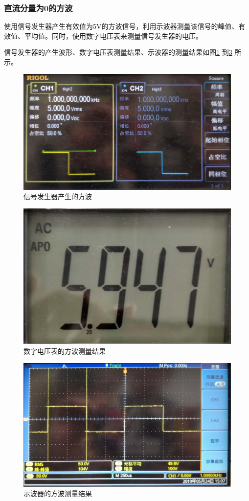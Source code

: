 \documentclass[12pt]{article}
\begin{document}
\subsubsection{直流分量为0的方波}
使用信号发生器产生有效值为5V的方波信号，利用示波器测量该信号的峰值、有效值、平均值。同时，使用数字电压表来测量信号发生器的电压。\par
信号发生器的产生波形、数字电压表测量结果、示波器的测量结果如图\ref{dianyacelfb1}
到\ref{dianyacelfb3}
所示。
\begin{figure}[htbp]
    \centering
    \includegraphics[width=.5\textwidth]{P009}
    \caption{信号发生器产生的方波}\label{dianyacelfb1}
  \end{figure}
  \begin{figure}[htbp]
    \centering
    \includegraphics[width=.5\textwidth]{P034}
    \caption{数字电压表的方波测量结果}\label{dianyacelfb2}
  \end{figure}
    \begin{figure}[htbp]
    \centering
    \includegraphics[width=.5\textwidth]{P011}
    \caption{示波器的方波测量结果}\label{dianyacelfb3}
  \end{figure}
\end{document}
